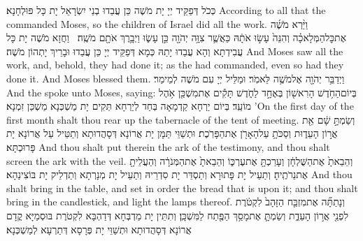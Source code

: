 {כְּכֹל דְּפַקֵּיד יְיָ יָת מֹשֶׁה כֵּן עֲבַדוּ בְנֵי יִשְׂרָאֵל יָת כָּל פּוּלְחָנָא׃}
{According to all that the \lord\space commanded Moses, so the children of Israel did all the work.}{}
{וַיַּ֨רְא מֹשֶׁ֜ה אֶת\maqqaf כׇּל\maqqaf הַמְּלָאכָ֗ה וְהִנֵּה֙ עָשׂ֣וּ אֹתָ֔הּ כַּאֲשֶׁ֛ר צִוָּ֥ה יְהֹוָ֖ה כֵּ֣ן עָשׂ֑וּ וַיְבָ֥רֶךְ אֹתָ֖ם מֹשֶֽׁה׃ \petucha }
{וַחֲזָא מֹשֶׁה יָת כָּל עֲבִידְתָא וְהָא עֲבַדוּ יָתַהּ כְּמָא דְּפַקֵּיד יְיָ כֵּן עֲבַדוּ וּבָרֵיךְ יָתְהוֹן מֹשֶׁה׃}
{And Moses saw all the work, and, behold, they had done it; as the \lord\space had commanded, even so had they done it. And Moses blessed them.}{}
\newperek
{}%
{וַיְדַבֵּ֥ר יְהֹוָ֖ה אֶל\maqqaf מֹשֶׁ֥ה לֵּאמֹֽר׃}
{וּמַלֵּיל יְיָ עִם מֹשֶׁה לְמֵימַר׃}
{And the \lord\space spoke unto Moses, saying:}{}
{בְּיוֹם\maqqaf הַחֹ֥דֶשׁ הָרִאשׁ֖וֹן בְּאֶחָ֣ד לַחֹ֑דֶשׁ תָּקִ֕ים אֶת\maqqaf מִשְׁכַּ֖ן אֹ֥הֶל מוֹעֵֽד׃}
{בְּיוֹם יַרְחָא קַדְמָאָה בְּחַד לְיַרְחָא תְּקִים יָת מַשְׁכְּנָא מַשְׁכַּן זִמְנָא׃}
{’On the first day of the first month shalt thou rear up the tabernacle of the tent of meeting.}{}
{וְשַׂמְתָּ֣ שָׁ֔ם אֵ֖ת אֲר֣וֹן הָעֵד֑וּת וְסַכֹּתָ֥ עַל\maqqaf הָאָרֹ֖ן אֶת\maqqaf הַפָּרֹֽכֶת׃}
{וּתְשַׁוֵּי תַּמָּן יָת אֲרוֹנָא דְּסָהֲדוּתָא וְתַטֵּיל עַל אֲרוֹנָא יָת פָּרוּכְתָּא׃}
{And thou shalt put therein the ark of the testimony, and thou shalt screen the ark with the veil.}{}
{וְהֵבֵאתָ֙ אֶת\maqqaf הַשֻּׁלְחָ֔ן וְעָרַכְתָּ֖ אֶת\maqqaf עֶרְכּ֑וֹ וְהֵבֵאתָ֙ אֶת\maqqaf הַמְּנֹרָ֔ה וְהַעֲלֵיתָ֖ אֶת\maqqaf נֵרֹתֶֽיהָ׃}
{וְתַעֵיל יָת פָּתוּרָא וְתַסְדֵּר יָת סִדְרֵיהּ וְתַעֵיל יָת מְנָרְתָא וְתַדְלֵיק יָת בּוֹצִינַהָא׃}
{And thou shalt bring in the table, and set in order the bread that is upon it; and thou shalt bring in the candlestick, and light the lamps thereof.}{}
{וְנָתַתָּ֞ה אֶת\maqqaf מִזְבַּ֤ח הַזָּהָב֙ לִקְטֹ֔רֶת לִפְנֵ֖י אֲר֣וֹן הָעֵדֻ֑ת וְשַׂמְתָּ֛ אֶת\maqqaf מָסַ֥ךְ הַפֶּ֖תַח לַמִּשְׁכָּֽן׃}
{וְתִתֵּין יָת מַדְבְּחָא דְּדַהְבָּא לִקְטֹרֶת בּוּסְמַיָּא קֳדָם אֲרוֹנָא דְּסָהֲדוּתָא וּתְשַׁוֵּי יָת פְּרָסָא דְּתַרְעָא לְמַשְׁכְּנָא׃}
